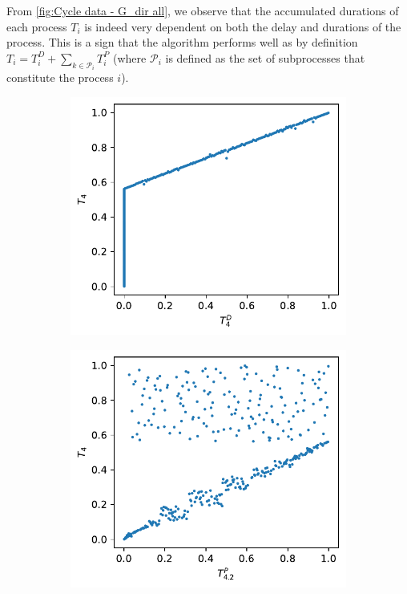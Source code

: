 \documentclass[../Thesis.tex]{subfiles}
\begin{document}
From \autoref{fig:Cycle data - G_dir all}, we observe that the accumulated durations of each process $T_i$ is indeed very dependent on both the delay and durations of the process. This is a sign that the algorithm performs well as by definition $T_i = T^D_i + \sum_{k\in \mathcal{P}_i} T^P_i$ (where $\mathcal{P}_i$ is defined as the set of subprocesses that constitute the process $i$).
\begin{figure}[H]
    \centering
    \begin{subfigure}[t]{0.49\linewidth}
        \includegraphics[width = .9\linewidth]{figures/Cycle data/G_dir complete - symmetric - TD4 vs T4.pdf}
        \caption{}
    \end{subfigure}
    \hfill
    \begin{subfigure}[t]{0.49\linewidth}
        \includegraphics[width = .9\linewidth]{figures/Cycle data/G_dir complete - symmetric - TP4 vs T4.pdf}

\end{subfigure}
\end{figure}
\end{document}
